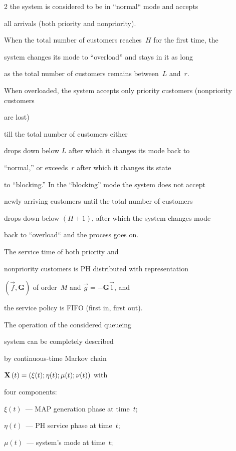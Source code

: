 \begin{multicols}{2}
the system is considered to be in ``normal`` mode and accepts 


all arrivals (both priority and nonpriority). 


When the total number of customers reaches~$H$ for the first time, the


system changes its mode to ``overload'' and stays in it as long


as the total number of customers remains between~$L$ and~$r$.


When overloaded, the system accepts only priority customers (nonpriority customers 


are lost)


till the total number of customers either


drops down below $L$ after which it changes its mode back to


``normal,'' or exceeds~$r$ after which it changes its state


to ``blocking.'' In the ``blocking'' mode the system does not accept


newly arriving customers until the total number of customers


drops down below $(H+1)$, after which the system changes mode 


back to ``overload`` and the process goes on.


The service time of both priority and


nonpriority customers is PH distributed with representation


$(\vec{f}, \mathbf{G})$ of order~$M$ and $\vec g=-\mathbf{G}\vec1$, and


the service policy is FIFO (first in, first out).











The operation of the considered queueing


system can be completely described


by continuous-time Markov chain 


${\bf{X}} \left( t \right)= {\left( \xi (t); \eta(t); \mu(t); \nu(t) \right) }$ with


four components:


$\xi(t)$~--- MAP generation phase at time~$t$;


$\eta(t)$~--- PH service phase at time~$t$;


$\mu(t)$~--- system's mode at time~$t$;



\end{multicols}
